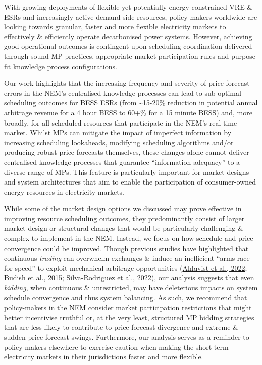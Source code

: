 \documentclass[12pt,a4paper,]{report}
\begin{document}
With growing deployments of flexible yet potentially energy-constrained
VRE \& ESRs and increasingly active demand-side resources, policy-makers
worldwide are looking towards granular, faster and more flexible
electricity markets to effectively \& efficiently operate decarbonised
power systems. However, achieving good operational outcomes is
contingent upon scheduling coordination delivered through sound MP
practices, appropriate market participation rules and purpose-fit
knowledge process configurations.

Our work highlights that the increasing frequency and severity of price
forecast errors in the NEM's centralised knowledge processes can lead to
sub-optimal scheduling outcomes for BESS ESRs (from
\textasciitilde15-20\% reduction in potential annual arbitrage revenue
for a 4 hour BESS to 60+\% for a 15 minute BESS) and, more broadly, for
all scheduled resources that participate in the NEM's real-time market.
Whilst MPs can mitigate the impact of imperfect information by
increasing scheduling lookaheads, modifying scheduling algorithms and/or
producing robust price forecasts themselves, these changes alone cannot
deliver centralised knowledge processes that guarantee ``information
adequacy'' to a diverse range of MPs. This feature is particularly
important for market designs and system architectures that aim to enable
the participation of consumer-owned energy resources in electricity
markets.

While some of the market design options we discussed may prove effective
in improving resource scheduling outcomes, they predominantly consist of
larger market design or structural changes that would be particularly
challenging \& complex to implement in the NEM. Instead, we focus on how
schedule and price convergence could be improved. Though previous
studies have highlighted that continuous \emph{trading} can overwhelm
exchanges \& induce an inefficient ``arms race for speed'' to exploit
mechanical arbitrage opportunities
(\protect\hyperlink{ref-ahlqvistSurveyComparingCentralized2022}{Ahlqvist
et al., 2022};
\protect\hyperlink{ref-budishHighFrequencyTradingArms2015}{Budish et
al., 2015};
\protect\hyperlink{ref-silva-rodriguezShortTermWholesale2022}{Silva-Rodriguez
et al., 2022}), our analysis suggests that even \emph{bidding}, when
continuous \& unrestricted, may have deleterious impacts on system
schedule convergence and thus system balancing. As such, we recommend
that policy-makers in the NEM consider market participation restrictions
that might better incentivise truthful or, at the very least, structured
MP bidding strategies that are less likely to contribute to price
forecast divergence and extreme \& sudden price forecast swings.
Furthermore, our analysis serves as a reminder to policy-makers
elsewhere to exercise caution when making the short-term electricity
markets in their jurisdictions faster and more flexible.
\end{document}
